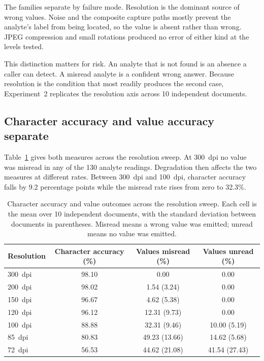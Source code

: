 \documentclass[11pt]{article}
\begin{document}
The families separate by failure mode. Resolution is the dominant source of wrong values.
Noise and the composite capture paths mostly prevent the analyte's label from being located, so
the value is absent rather than wrong. JPEG compression and small rotations produced no error of
either kind at the levels tested.

This distinction matters for risk. An analyte that is not found is an absence a caller can
detect. A misread analyte is a confident wrong answer. Because resolution is the condition that
most readily produces the second case, Experiment~2 replicates the resolution axis across 10
independent documents.

\subsection{Character accuracy and value accuracy separate}

Table~\ref{tab:resolution} gives both measures across the resolution sweep. At 300~dpi no
value was misread in any of the 130 analyte readings. Degradation then affects the two measures
at different rates. Between 300~dpi and 100~dpi, character accuracy falls by
9.2 percentage points while the misread rate rises from zero to 32.3\%.

\begin{table}[t]
\centering
\caption{Character accuracy and value outcomes across the resolution sweep. Each cell is the
mean over 10 independent documents, with the standard deviation between documents in
parentheses. Misread means a wrong value was emitted; unread means no value was emitted.}
\label{tab:resolution}
\small
\begin{tabular}{lccc}
\toprule
Resolution & Character accuracy (\%) & Values misread (\%) & Values unread (\%) \\
\midrule
300~dpi & 98.10 & \phantom{0}0.00 \phantom{(00.00)} & \phantom{0}0.00 \phantom{(00.00)} \\
200~dpi & 98.02 & \phantom{0}1.54 (3.24) & \phantom{0}0.00 \phantom{(00.00)} \\
150~dpi & 96.67 & \phantom{0}4.62 (5.38) & \phantom{0}0.00 \phantom{(00.00)} \\
120~dpi & 96.12 & 12.31 (9.73) & \phantom{0}0.00 \phantom{(00.00)} \\
100~dpi & 88.88 & 32.31 (9.46) & 10.00 (5.19) \\
85~dpi  & 80.83 & 49.23 (13.66) & 14.62 (5.68) \\
72~dpi  & 56.53 & 44.62 (21.08) & 41.54 (27.43) \\
\bottomrule
\end{tabular}
\end{table}
\end{document}
